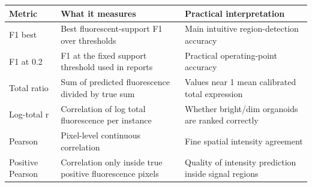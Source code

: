 \begin{tabular}{@{}lll@{}}
\toprule
Metric & What it measures & Practical interpretation \\
\midrule
F1 best & Best fluorescent-support F1 over thresholds & Main intuitive region-detection accuracy \\
F1 at 0.2 & F1 at the fixed support threshold used in reports & Practical operating-point accuracy \\
Total ratio & Sum of predicted fluorescence divided by true sum & Values near 1 mean calibrated total expression \\
Log-total r & Correlation of log total fluorescence per instance & Whether bright/dim organoids are ranked correctly \\
Pearson & Pixel-level continuous correlation & Fine spatial intensity agreement \\
Positive Pearson & Correlation only inside true positive fluorescence pixels & Quality of intensity prediction inside signal regions \\
\bottomrule
\end{tabular}
